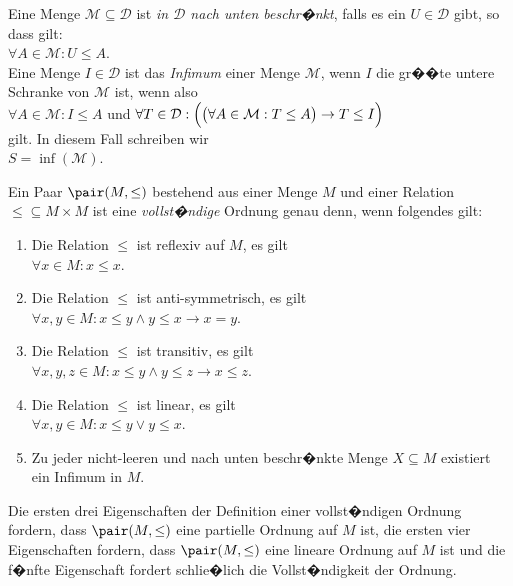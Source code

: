 \begin{Definition}[Infimum]
Eine Menge $\mathcal{M} \subseteq \mathcal{D}$ ist \emph{in $\mathcal{D}$ nach unten beschr�nkt}, falls es ein
 $U \in \mathcal{D}$ gibt, so dass gilt:
\\[0.2cm]
\hspace*{1.3cm}
$\forall A \in \mathcal{M}:  U \leq A$.
\\[0.2cm]
Eine Menge $I \in \mathcal{D}$ ist das \emph{Infimum} einer Menge $\mathcal{M}$, wenn $I$ die gr��te
untere Schranke von $\mathcal{M}$ ist, wenn also 
\\[0.2cm]
\hspace*{1.3cm}
$\forall A \in \mathcal{M}: I \leq A$ \quad \mbox{und} \quad
$\forall T \in \mathcal{D}: \Bigl(\bigl(\forall A \in \mathcal{M}: T \leq A \bigr)\rightarrow T \leq I \Bigr)$
\\[0.2cm]
gilt.  In diesem Fall schreiben wir
\\[0.2cm]
\hspace*{1.3cm}
$S = \inf( \mathcal{M} )$.
\eod
\end{Definition}

\begin{Definition}
  Ein Paar $\pair(M, \leq)$ bestehend aus einer Menge $M$ und einer Relation $\leq \subseteq M \times M$ 
  ist eine \emph{vollst�ndige} Ordnung genau denn, wenn folgendes gilt:
  \begin{enumerate}
  \item Die Relation $\leq$ ist reflexiv auf $M$, es gilt 
        \\[0.2cm]
        \hspace*{1.3cm}
        $\forall x \in M: x \leq x$.
  \item Die Relation $\leq$ ist anti-symmetrisch, es gilt
        \\[0.2cm]
        \hspace*{1.3cm}
        $\forall x, y \in M: x \leq y \wedge y \leq x \rightarrow x = y$.
  \item Die Relation $\leq$ ist transitiv, es gilt
        \\[0.2cm]
        \hspace*{1.3cm}
        $\forall x, y, z \in M: x \leq y \wedge y \leq z \rightarrow x \leq z$.
  \item Die Relation $\leq$ ist linear, es gilt
        \\[0.2cm]
        \hspace*{1.3cm}
        $\forall x, y \in M: x \leq y \vee y \leq x$.
  \item Zu jeder nicht-leeren und nach unten beschr�nkte Menge $X \subseteq M$ existiert ein
        Infimum in $M$. \eod
  \end{enumerate}
\end{Definition}
Die ersten drei Eigenschaften der Definition einer vollst�ndigen Ordnung fordern, dass 
$\pair(M, \leq)$ eine partielle Ordnung auf $M$ ist, die ersten vier Eigenschaften fordern, dass 
$\pair(M, \leq)$ eine lineare Ordnung auf $M$ ist und die f�nfte Eigenschaft fordert schlie�lich die
Vollst�ndigkeit der Ordnung.


